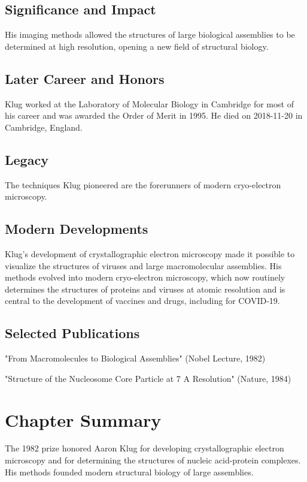 \subsection*{Significance and Impact}

His imaging methods allowed the structures of large biological assemblies to be determined at high resolution, opening a new field of structural biology.

\subsection*{Later Career and Honors}

Klug worked at the Laboratory of Molecular Biology in Cambridge for most of his career and was awarded the Order of Merit in 1995. He died on 2018-11-20 in Cambridge, England.

\subsection*{Legacy}

The techniques Klug pioneered are the forerunners of modern cryo-electron microscopy.

\subsection*{Modern Developments}

Klug's development of crystallographic electron microscopy made it possible to visualize the structures of viruses and large macromolecular assemblies. His methods evolved into modern cryo-electron microscopy, which now routinely determines the structures of proteins and viruses at atomic resolution and is central to the development of vaccines and drugs, including for COVID-19.

\subsection*{Selected Publications}

"From Macromolecules to Biological Assemblies" (Nobel Lecture, 1982)

"Structure of the Nucleosome Core Particle at 7 A Resolution" (Nature, 1984)

\clearpage

\section*{Chapter Summary}

The 1982 prize honored Aaron Klug for developing crystallographic electron microscopy and for determining the structures of nucleic acid-protein complexes. His methods founded modern structural biology of large assemblies.

